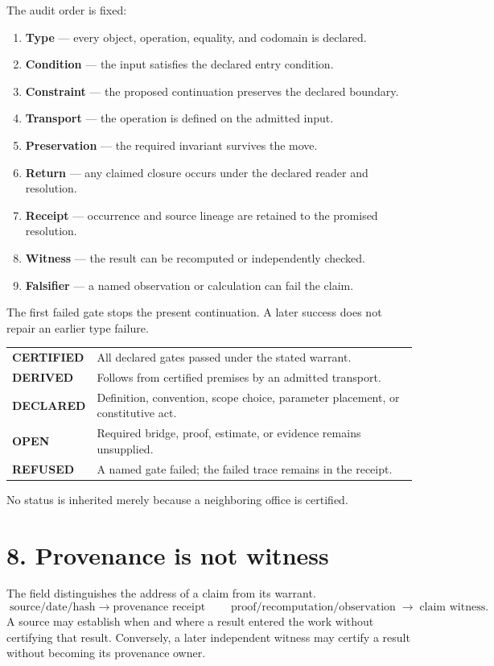 \documentclass[10.5pt]{article}
\begin{document}
The audit order is fixed:
\begin{enumerate}
\item \textbf{Type} --- every object, operation, equality, and codomain is declared.
\item \textbf{Condition} --- the input satisfies the declared entry condition.
\item \textbf{Constraint} --- the proposed continuation preserves the declared boundary.
\item \textbf{Transport} --- the operation is defined on the admitted input.
\item \textbf{Preservation} --- the required invariant survives the move.
\item \textbf{Return} --- any claimed closure occurs under the declared reader and resolution.
\item \textbf{Receipt} --- occurrence and source lineage are retained to the promised resolution.
\item \textbf{Witness} --- the result can be recomputed or independently checked.
\item \textbf{Falsifier} --- a named observation or calculation can fail the claim.
\end{enumerate}
The first failed gate stops the present continuation. A later success does not repair an earlier type failure.

\begin{center}
\begin{tabularx}{0.92\textwidth}{>{\bfseries\ttfamily}p{}X}
\toprule
CERTIFIED & All declared gates passed under the stated warrant.\\
DERIVED & Follows from certified premises by an admitted transport.\\
DECLARED & Definition, convention, scope choice, parameter placement, or constitutive act.\\
OPEN & Required bridge, proof, estimate, or evidence remains unsupplied.\\
REFUSED & A named gate failed; the failed trace remains in the receipt.\\
\bottomrule
\end{tabularx}
\end{center}
No status is inherited merely because a neighboring office is certified.

\section*{8. Provenance is not witness}
The field distinguishes the address of a claim from its warrant.
\[
\boxed{
\text{source/date/hash}\;\longrightarrow\;\text{provenance receipt}}
\qquad
\boxed{
\text{proof/recomputation/observation}\;\longrightarrow\;\text{claim witness}.}
\]
A source may establish when and where a result entered the work without certifying that result. Conversely, a later independent witness may certify a result without becoming its provenance owner.
\end{document}
